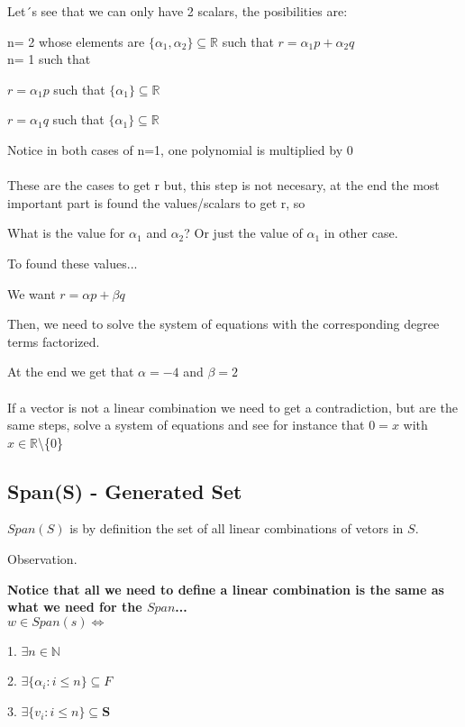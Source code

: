 \documentclass{article}
\begin{document}
Let´s see that we can only have 2 scalars, the posibilities are:

n= 2 whose elements are \(\{ \alpha_1, \alpha_2\} \subseteq \mathbb{R}\) such that \(r=\alpha_1 p + \alpha_2 q\)
\\

n= 1 such that

\(r = \alpha_1 p\) such that \(\{\alpha_1\} \subseteq \mathbb{R}\)

\(r = \alpha_1 q\) such that \(\{\alpha_1\} \subseteq \mathbb{R}\)

Notice in both cases of n=1, one polynomial is multiplied by 0
\\
\\
These are the cases to get r but, this step is not necesary, at the end the most important part is found the values/scalars to get r, so

What is the value for \(\alpha_1\) and \(\alpha_2\)? Or just the value of \(\alpha_1\) in other case.

To found these values...

We want \(r=\alpha p + \beta q\)

Then, we need to solve the system of equations with the corresponding degree terms factorized. 

At the end we get that \(\alpha = -4\) and \(\beta = 2\)
\\
\\
If a vector is not a linear combination we need to get a contradiction, but are the same steps, solve a system of equations and see for instance that \(0=x\) with \(x\in \mathbb{R}\)\textbackslash \{0\}\

\subsection*{Span(S) - Generated Set}

\(Span(S)\) is by definition the set of all linear combinations of vetors in \(S\).

Observation.

\textbf{Notice that all we need to define a linear combination is the same as what we need for the \(Span\)...}
\\

\(w \in Span(s) \iff\)

1. \(\exists n \in \mathbb{N}\)

2. \(\exists \{ \alpha_i : i \leq n \} \subseteq F\)

3. \(\exists \{ v_i : i \leq n \} \subseteq \textbf{S}\)
\end{document}
